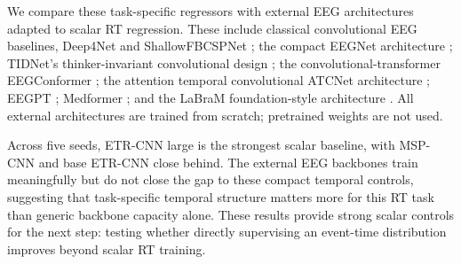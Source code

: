 \documentclass[12pt]{article}
\begin{document}
We compare these task-specific regressors with external EEG architectures adapted to scalar RT regression. These include classical convolutional EEG baselines, Deep4Net and ShallowFBCSPNet \citep{braindecode}; the compact EEGNet architecture \citep{lawhern2018eegnet}; TIDNet's thinker-invariant convolutional design \citep{kostas2020thinkerinvariance}; the convolutional-transformer EEGConformer \citep{song2023eegconformer}; the attention temporal convolutional ATCNet architecture \citep{altaheri2022atcnet}; EEGPT \citep{wang2024eegpt}; Medformer \citep{wang2024medformer}; and the LaBraM foundation-style architecture \citep{Jiang2024LaBraM}. All external architectures are trained from scratch; pretrained weights are not used.

Across five seeds, ETR-CNN large is the strongest scalar baseline, with MSP-CNN and base ETR-CNN close behind. The external EEG backbones train meaningfully but do not close the gap to these compact temporal controls, suggesting that task-specific temporal structure matters more for this RT task than generic backbone capacity alone. These results provide strong scalar controls for the next step: testing whether directly supervising an event-time distribution improves beyond scalar RT training.
\end{document}
